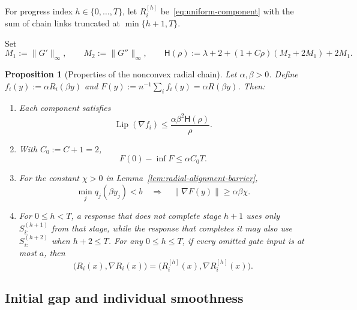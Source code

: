 \documentclass{article}
\newtheorem{proposition}[theorem]{Proposition}
\theoremstyle{definition}
\begin{document}
For progress index $h\in\{0,\ldots,T\}$, let $R_i^{[h]}$
be~\eqref{eq:uniform-component} with the sum of chain links truncated at
$\min\{h+1,T\}$.

Set
\begin{equation}
 M_1:=\|G'\|_\infty,
 \qquad
 M_2:=\|G''\|_\infty,
 \qquad
 \mathsf H(\rho):=
 \lambda+2+(1+C\rho)(M_2+2M_1)+2M_1.
 \label{eq:nonconvex-general-H}
\end{equation}

\begin{proposition}[Properties of the nonconvex radial chain]
\label{prop:nonconvex-chain-properties}
Let $\alpha,\beta>0$.  Define
$f_i(y):=\alpha R_i(\beta y)$ and
$F(y):=n^{-1}\sum_i f_i(y)=\alpha R(\beta y)$.  Then:
\begin{enumerate}[label=\textup{(\roman*)},leftmargin=*,itemsep=2pt]
 \item\label{item:nc-property-smoothness}
 Each component satisfies
 \begin{equation}
  \operatorname{Lip}(\nabla f_i)
  \le\frac{\alpha\beta^2\mathsf H(\rho)}{\rho}.
  \label{eq:nc-property-smoothness}
 \end{equation}
 \item\label{item:nc-property-gap}
 With $C_0:=C+1=2$,
 \begin{equation}
  F(0)-\inf F\le\alpha C_0T.
  \label{eq:nc-property-gap}
 \end{equation}
 \item\label{item:nc-property-barrier}
 For the constant $\chi>0$ in
 Lemma~\ref{lem:radial-alignment-barrier},
 \begin{equation}
  \min_jq_j(\beta y_j)<b
  \quad\Longrightarrow\quad
  \|\nabla F(y)\|\ge\alpha\beta\chi.
  \label{eq:nc-property-barrier}
 \end{equation}
 \item\label{item:nc-property-revelation}
 For $0\le h<T$, a response that does not complete stage $h+1$ uses only
 $S^{(h+1)}_{i:}$ from that stage, while the response that completes it may
 also use $S^{(h+2)}_{i:}$ when
 $h+2\le T$.  For any $0\le h\le T$, if every omitted gate input is at most
 $a$, then
 \begin{equation}
  \bigl(R_i(x),\nabla R_i(x)\bigr)
  =\bigl(R_i^{[h]}(x),\nabla R_i^{[h]}(x)\bigr).
  \label{eq:nc-property-revelation}
 \end{equation}
\end{enumerate}
\end{proposition}

\subsection{Initial gap and individual smoothness}
\end{document}
